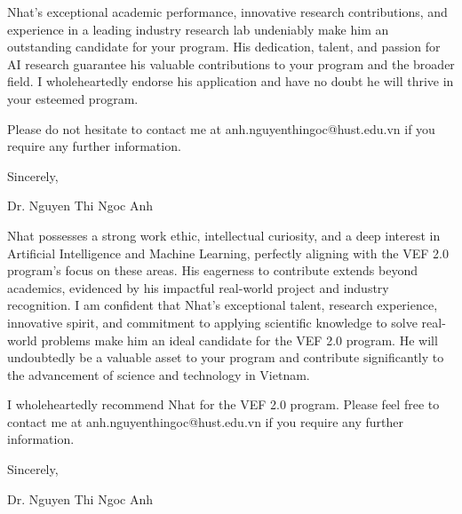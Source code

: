 Nhat's exceptional academic performance, innovative research contributions, and experience in a leading industry research lab undeniably make him an outstanding candidate for your program.  His dedication, talent, and passion for AI research guarantee his valuable contributions to your program and the broader field. I wholeheartedly endorse his application and have no doubt he will thrive in your esteemed program.

Please do not hesitate to contact me at anh.nguyenthingoc@hust.edu.vn if you require any further information.

Sincerely,

Dr. Nguyen Thi Ngoc Anh

Nhat possesses a strong work ethic, intellectual curiosity, and a deep interest in Artificial Intelligence and Machine Learning, perfectly aligning with the VEF 2.0 program's focus on these areas. His eagerness to contribute extends beyond academics, evidenced by his impactful real-world project and industry recognition. I am confident that Nhat's exceptional talent, research experience, innovative spirit, and commitment to applying scientific knowledge to solve real-world problems make him an ideal candidate for the VEF 2.0 program. He will undoubtedly be a valuable asset to your program and contribute significantly to the advancement of science and technology in Vietnam.

I wholeheartedly recommend Nhat for the VEF 2.0 program. Please feel free to contact me at anh.nguyenthingoc@hust.edu.vn if you require any further information.

Sincerely,

Dr. Nguyen Thi Ngoc Anh